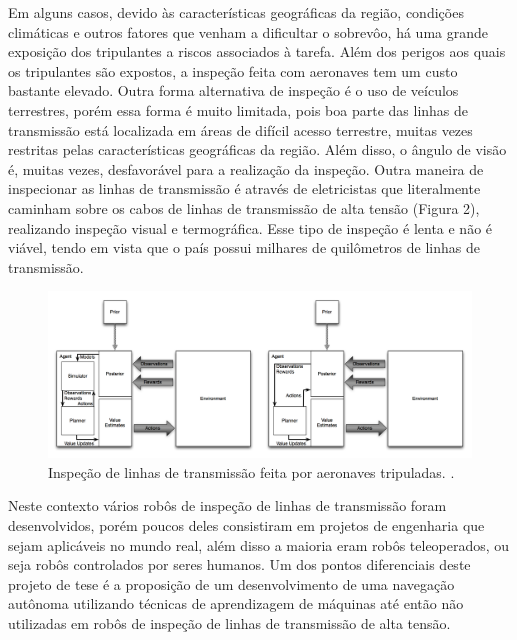 Em alguns casos, devido às características geográficas da região, condições climáticas e outros fatores que venham a dificultar o sobrevôo, há uma grande exposição dos tripulantes a riscos associados à tarefa. Além dos perigos aos quais os tripulantes são expostos, a inspeção feita com aeronaves tem um custo bastante elevado. Outra forma alternativa de inspeção é o uso de veículos terrestres, porém essa forma é muito limitada, pois boa parte das linhas de transmissão está localizada em áreas de difícil acesso terrestre, muitas vezes restritas pelas características geográficas da região. Além disso, o ângulo de visão é, muitas vezes, desfavorável para a realização da inspeção.
Outra maneira de inspecionar as linhas de transmissão é através de eletricistas que literalmente caminham sobre os cabos de linhas de transmissão de alta tensão (Figura 2), realizando inspeção visual e termográfica. Esse tipo de inspeção é lenta e não é viável, tendo em vista que o país possui milhares de quilômetros de linhas de transmissão.
\begin{figure} [h!]												%
	\centering													%
	\includegraphics[width=1.0\textwidth]{./asmuth}				%
	\caption{Inspeção de linhas de transmissão feita por aeronaves tripuladas. \cite{asm:13}.}			%
	\label{asmuth}												%
\end{figure}													%

Neste contexto vários robôs de inspeção de linhas de transmissão foram desenvolvidos, porém poucos deles consistiram em projetos de engenharia que sejam aplicáveis no mundo real, além disso a maioria eram robôs teleoperados, ou seja robôs controlados por seres humanos. Um dos pontos diferenciais deste projeto de tese é a proposição de um desenvolvimento de uma navegação autônoma utilizando técnicas de aprendizagem de máquinas até então não utilizadas em robôs de inspeção de linhas de transmissão de alta tensão.

